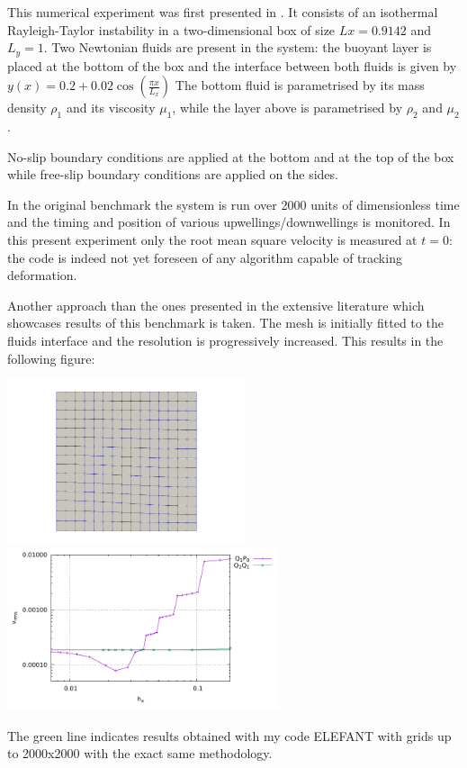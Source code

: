 

This numerical experiment was first presented in \cite{vaks97}.
It consists of an isothermal Rayleigh-Taylor instability in a two-dimensional box
of size $Lx=0.9142$ and $L_y=1$.
Two Newtonian fluids are present in the system: the buoyant layer is placed at the bottom of 
the box and the interface between both fluids is given by 
$
y(x)=0.2+0.02\cos \left( \frac{\pi x}{L_x}  \right)
$
The bottom fluid is parametrised by its mass density $\rho_1$ and its viscosity $\mu_1$, 
while the layer above is parametrised by $\rho_2$ and $\mu_2$.

No-slip boundary conditions are applied at the bottom and at the top of the box 
while free-slip boundary conditions are applied on the sides. 

In the original benchmark the system is run over 2000 units of dimensionless time and the 
timing and position of various upwellings/downwellings is monitored. 
In this present experiment only the root mean square velocity is measured at $t=0$:
the code is indeed not yet foreseen of any algorithm capable of tracking deformation.

Another approach than the ones presented in the extensive literature which showcases 
results of this benchmark is taken. The mesh is initially fitted to the fluids
interface and the resolution is progressively increased. This results in the 
following figure:

\begin{center}
\includegraphics[width=7cm]{python_codes/fieldstone_25/results/grid}
\includegraphics[width=8cm]{python_codes/fieldstone_25/results/vrms.pdf}
\end{center}
The green line indicates results obtained with my code ELEFANT with grids up to 2000x2000
with the exact same methodology.

